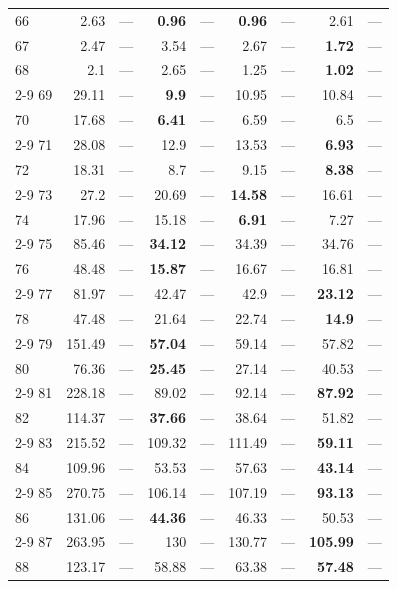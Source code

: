 \begin{longtable}{lr@{\hskip 4pt}l@{\hskip 12pt}r@{\hskip 4pt}l@{\hskip 12pt}r@{\hskip 4pt}l@{\hskip 12pt}r@{\hskip 4pt}l@{\hskip 12pt}}
66 & 2.63 & --- & \textbf{0.96} & --- & \textbf{0.96} & --- & 2.61 & --- \\
67 & 2.47 & --- & 3.54 & --- & 2.67 & --- & \textbf{1.72} & --- \\
68 & 2.1 & --- & 2.65 & --- & 1.25 & --- & \textbf{1.02} & --- \\
\cmidrule{2-9}
69 & 29.11 & --- & \textbf{9.9} & --- & 10.95 & --- & 10.84 & --- \\
70 & 17.68 & --- & \textbf{6.41} & --- & 6.59 & --- & 6.5 & --- \\
\cmidrule{2-9}
71 & 28.08 & --- & 12.9 & --- & 13.53 & --- & \textbf{6.93} & --- \\
72 & 18.31 & --- & 8.7 & --- & 9.15 & --- & \textbf{8.38} & --- \\
\cmidrule{2-9}
73 & 27.2 & --- & 20.69 & --- & \textbf{14.58} & --- & 16.61 & --- \\
74 & 17.96 & --- & 15.18 & --- & \textbf{6.91} & --- & 7.27 & --- \\
\cmidrule{2-9}
75 & 85.46 & --- & \textbf{34.12} & --- & 34.39 & --- & 34.76 & --- \\
76 & 48.48 & --- & \textbf{15.87} & --- & 16.67 & --- & 16.81 & --- \\
\cmidrule{2-9}
77 & 81.97 & --- & 42.47 & --- & 42.9 & --- & \textbf{23.12} & --- \\
78 & 47.48 & --- & 21.64 & --- & 22.74 & --- & \textbf{14.9} & --- \\
\cmidrule{2-9}
79 & 151.49 & --- & \textbf{57.04} & --- & 59.14 & --- & 57.82 & --- \\
80 & 76.36 & --- & \textbf{25.45} & --- & 27.14 & --- & 40.53 & --- \\
\cmidrule{2-9}
81 & 228.18 & --- & 89.02 & --- & 92.14 & --- & \textbf{87.92} & --- \\
82 & 114.37 & --- & \textbf{37.66} & --- & 38.64 & --- & 51.82 & --- \\
\cmidrule{2-9}
83 & 215.52 & --- & 109.32 & --- & 111.49 & --- & \textbf{59.11} & --- \\
84 & 109.96 & --- & 53.53 & --- & 57.63 & --- & \textbf{43.14} & --- \\
\cmidrule{2-9}
85 & 270.75 & --- & 106.14 & --- & 107.19 & --- & \textbf{93.13} & --- \\
86 & 131.06 & --- & \textbf{44.36} & --- & 46.33 & --- & 50.53 & --- \\
\cmidrule{2-9}
87 & 263.95 & --- & 130 & --- & 130.77 & --- & \textbf{105.99} & --- \\
88 & 123.17 & --- & 58.88 & --- & 63.38 & --- & \textbf{57.48} & --- \\

\end{longtable}
